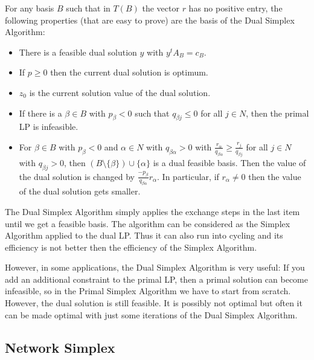\documentclass[12pt, showidx, twoside]{article}
\begin{document}
{{{For any basis $B$ such that in $T(B)$ the vector $r$ has no positive entry,
the following properties (that are easy to prove) are the basis of the
{\sc Dual Simplex Algorithm}:
\begin{itemize}
   \item There is a feasible dual solution $y$ with $y^t A_B = c_B$.
   \item If $p \geq 0$ then the current dual solution is optimum.
   \item $z_0$ is the current solution value of the dual solution.
   \item If there is a $\beta \in B$ with $p_\beta < 0$ such that
         $q_{\beta j} \leq 0$ for all $j \in N$, then the primal LP is
         infeasible.
   \item For $\beta \in B$ with $p_\beta < 0$ and $\alpha \in N$ with
         $q_{\beta \alpha} > 0$ with
         $\frac{r_\alpha}{q_{\beta \alpha}} \geq \frac{r_j}{q_{\beta j}}$ for all
         $j \in N$ with  $q_{\beta j} > 0$, then 
         $(B\setminus\{\beta\})\cup\{\alpha\}$ is a dual feasible basis.
         Then the value of the dual solution
         is changed by $\frac{-p_\beta}{q_{\beta \alpha}} r_\alpha$. In particular,
         if $r_\alpha \neq 0$ then the value of the dual solution gets smaller.
\end{itemize}

The {\sc Dual Simplex Algorithm}
simply applies the exchange steps in the 
last item until we get a feasible basis. The algorithm can be considered
as the  {\sc Simplex Algorithm} applied to the dual LP. Thus it can also
run into cycling and its efficiency is not better then the efficiency
of the {\sc Simplex Algorithm}.

However, in some applications, the {\sc Dual Simplex Algorithm} is very
useful: If you add an additional constraint to the primal LP, then a
primal solution can become infeasible, so in the {\sc Primal Simplex Algorithm}
we have to start from scratch. 
However, the dual solution is still feasible. It is possibly not optimal
but often it can be made optimal with just some iterations of the 
{\sc Dual Simplex Algorithm}.


\subsection{Network Simplex}


}}}
\end{document}
